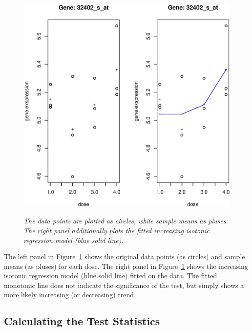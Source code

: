 \begin{figure}[!h]
\centering
{\includegraphics[width=.6\textwidth]{exgene.eps}}
\caption{\em{The data points are plotted as circles, while sample
means as pluses. The right panel additionally plots the fitted
increasing isotonic regression model (blue solid line).}}
\label{exgene}
\end{figure}


The left panel in Figure~\ref{exgene} shows the original data points
(as circles) and sample means (as pluses) for each dose. The right
panel in Figure~\ref{exgene} shows the increasing isotonic
regression model (blue solid line) fitted on the data. The fitted
monotonic line does not indicate the significance of the test, but
simply shows a more likely increasing (or decreasing) trend.


\subsection{Calculating the Test Statistics}

